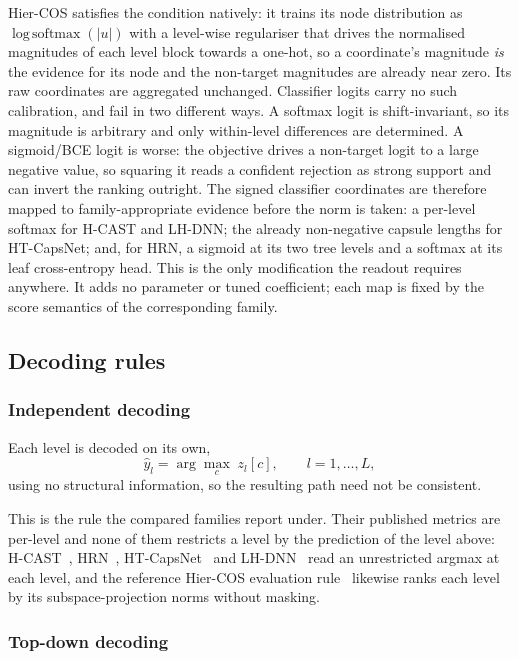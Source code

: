 Hier-COS satisfies the condition natively: it trains its node distribution as
$\operatorname{log\,softmax}(\lvert u\rvert)$ with a level-wise regulariser that
drives the normalised magnitudes of each level block towards a one-hot, so a
coordinate's magnitude \emph{is} the evidence for its node and the non-target
magnitudes are already near zero. Its raw coordinates are aggregated unchanged.
Classifier logits carry no such calibration, and fail in two different ways. A
softmax logit is shift-invariant, so its magnitude is arbitrary and only
within-level differences are determined. A sigmoid/BCE logit is worse: the
objective drives a non-target logit to a large negative value, so squaring it reads
a confident rejection as strong support and can invert the ranking outright.
The signed classifier coordinates are therefore mapped to family-appropriate
evidence before the norm is taken: a per-level softmax for H-CAST and LH-DNN;
the already non-negative capsule lengths for HT-CapsNet; and, for HRN, a sigmoid
at its two tree levels and a softmax at its leaf cross-entropy head. This is the
only modification the readout requires anywhere. It adds no parameter or tuned
coefficient; each map is fixed by the score semantics of the corresponding
family.

\subsection{Decoding rules}
\label{ssec:inference_decoding}

\subsubsection{Independent decoding}

Each level is decoded on its own,
\[
\hat y_l=\arg\max_{c}\; z_l[c],\qquad l=1,\dots,L ,
\]
using no structural information, so the resulting path need not be consistent.

This is the rule the compared families report under. Their published metrics are
per-level and none of them restricts a level by the prediction of the level above:
H-CAST~\cite{park2024visually}, HRN~\cite{chen2022label},
HT-CapsNet~\cite{noor2025taxonomy} and LH-DNN~\cite{fiaschi2024informed} read an
unrestricted argmax at each level, and the reference Hier-COS evaluation
rule~\cite{sani2025hiercos} likewise ranks each level by its
subspace-projection norms without masking.

\subsubsection{Top-down decoding}

